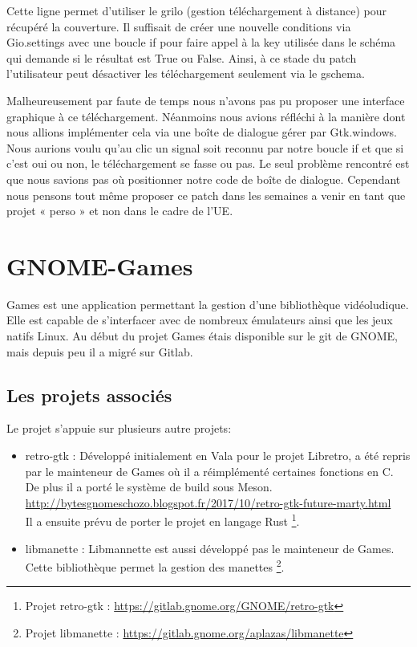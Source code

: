 \documentclass[12pt]{report}
\begin{document}
Cette ligne permet d'utiliser le grilo (gestion téléchargement à distance) pour récupéré la couverture.
Il suffisait de créer une nouvelle conditions via Gio.settings avec une boucle if pour faire appel à la key utilisée dans le schéma qui demande si le résultat est True ou False. Ainsi, à ce stade du patch l'utilisateur peut désactiver les téléchargement seulement via le gschema.

Malheureusement par faute de temps nous n'avons pas pu proposer une interface graphique à ce téléchargement. Néanmoins nous avions réfléchi à la manière dont nous allions implémenter cela via une boîte de dialogue gérer par Gtk.windows. Nous aurions voulu qu'au clic un signal soit reconnu par notre boucle if et que si c'est oui ou non, le téléchargement se fasse ou pas. 
Le seul problème rencontré est que nous savions pas où positionner notre code de boîte de dialogue. 
Cependant nous pensons tout même proposer ce patch dans les semaines a venir en tant que projet « perso » et non dans le cadre de l'UE. 



\newpage
\chapter{GNOME-Games} %
Games est une application permettant la gestion d'une
bibliothèque vidéoludique. Elle est capable de s'interfacer avec de
nombreux émulateurs ainsi que les jeux natifs Linux. Au début du
projet Games étais disponible sur le git de GNOME, mais depuis peu il
a migré sur Gitlab.

\section{Les projets associés}
Le projet s'appuie sur plusieurs autre projets:
\begin{itemize}
\item retro-gtk : Développé initialement en Vala pour le projet Libretro, a
  été repris par le mainteneur de Games où il a réimplémenté certaines
  fonctions en C. De plus il a porté le système de build sous Meson.\\
  \url{http://bytesgnomeschozo.blogspot.fr/2017/10/retro-gtk-future-marty.html}\\
  Il a ensuite prévu de porter le projet en langage Rust
  \footnote{Projet retro-gtk : \url{https://gitlab.gnome.org/GNOME/retro-gtk}}.
\item libmanette : Libmannette est aussi développé pas le mainteneur de Games. Cette bibliothèque
  permet la gestion des manettes
  \footnote{Projet libmanette : \url{https://gitlab.gnome.org/aplazas/libmanette}}.
\end{itemize}
\end{document}
